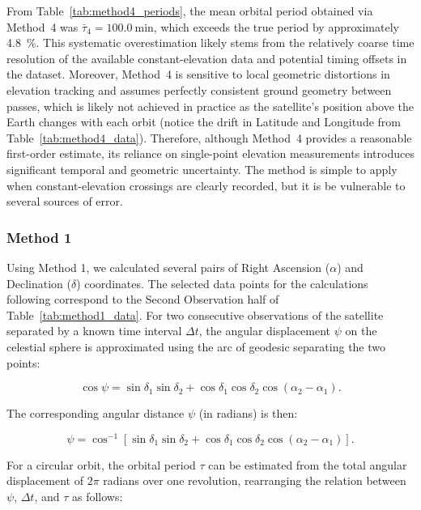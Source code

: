 \documentclass{article}
\begin{document}
From Table~\ref{tab:method4_periods}, the mean orbital period obtained via Method~4 was $\bar{\tau}_{4} = \SI{100.0}{\minute}$, which exceeds the true period by approximately \SI{4.8}{\percent}. This systematic overestimation likely stems from the relatively coarse time resolution of the available constant-elevation data and potential timing offsets in the dataset. Moreover, Method~4 is sensitive to local geometric distortions in elevation tracking and assumes perfectly consistent ground geometry between passes, which is likely not achieved in practice as the satellite's position above the Earth changes with each orbit (notice the drift in Latitude and Longitude from Table~\ref{tab:method4_data}). Therefore, although Method~4 provides a reasonable first-order estimate, its reliance on single-point elevation measurements introduces significant temporal and geometric uncertainty. The method is simple to apply when constant-elevation crossings are clearly recorded, but it is be vulnerable to several sources of error.

\subsubsection{Method 1}

Using Method 1, we calculated several pairs of Right Ascension ($\alpha$) and Declination ($\delta$) coordinates. The selected data points for the calculations following correspond to the Second Observation half of Table~\ref{tab:method1_data}. For two consecutive observations of the satellite separated by a known time interval $\Delta t$, the angular displacement $\psi$ on the celestial sphere is approximated using the arc of geodesic separating the two points:

\[
    \cos{\psi} = \sin{\delta_1}\sin{\delta_2} + \cos{\delta_1}\cos{\delta_2}\cos{(\alpha_2 - \alpha_1)}.
    \label{eq:psi_equation}
\]

The corresponding angular distance $\psi$ (in radians) is then:

\begin{equation}
    \psi = \cos^{-1}\!\left[\sin{\delta_1}\sin{\delta_2} + \cos{\delta_1}\cos{\delta_2}\cos{(\alpha_2 - \alpha_1)}\right].
    \label{eq:psi_angle}
\end{equation}

For a circular orbit, the orbital period $\tau$ can be estimated from the total angular displacement of $2\pi$ radians over one revolution, rearranging the relation between $\psi$, $\Delta t$, and $\tau$ as follows:
\end{document}
